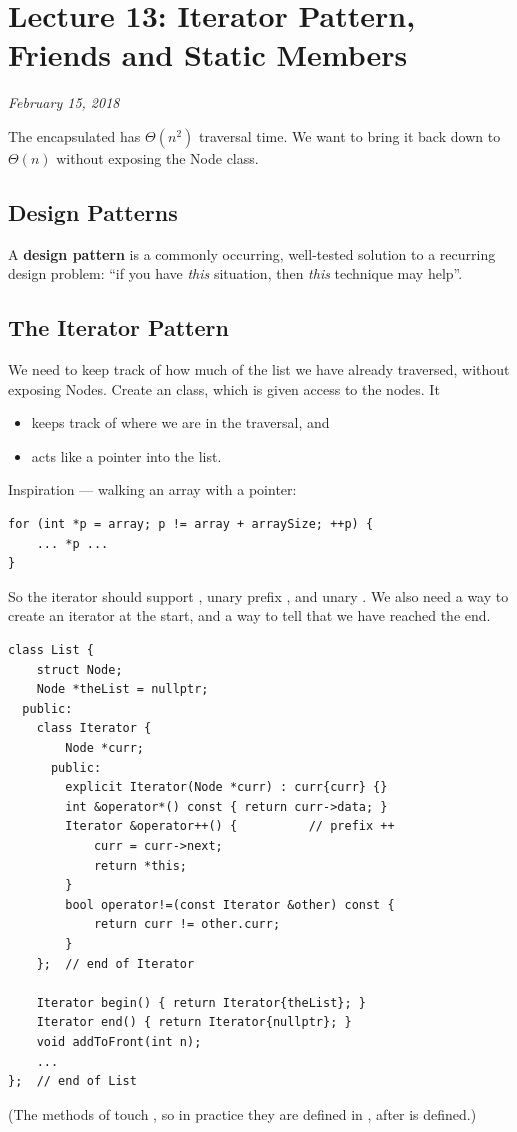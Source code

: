 \chapter{Lecture 13: Iterator Pattern, Friends and Static Members}
\begin{center}
\textit{February 15, 2018}
\end{center}

The encapsulated  has $\Theta(n^2)$ traversal time. We want to bring it
back down to $\Theta(n)$ without exposing the Node class.

\section{Design Patterns}
\begin{definition}
A \textbf{design pattern} is a commonly occurring, well-tested solution to a
recurring design problem: ``if you have \emph{this} situation, then \emph{this}
technique may help''.
\end{definition}

\section{The Iterator Pattern}
We need to keep track of how much of the list we have already traversed,
without exposing Nodes. Create an  class, which is given access
to the nodes. It
\begin{itemize}
  \item keeps track of where we are in the traversal, and
  \item acts like a pointer into the list.
\end{itemize}

Inspiration --- walking an array with a pointer:
\begin{lstlisting}[style=cpp]
for (int *p = array; p != array + arraySize; ++p) {
    ... *p ...
}
\end{lstlisting}
So the iterator should support \code{!=}, unary prefix \code{++}, and unary
\code{*}. We also need a way to create an iterator at the start, and a way to
tell that we have reached the end.

\begin{lstlisting}[style=cpp]
class List {
    struct Node;
    Node *theList = nullptr;
  public:
    class Iterator {
        Node *curr;
      public:
        explicit Iterator(Node *curr) : curr{curr} {}
        int &operator*() const { return curr->data; }
        Iterator &operator++() {          // prefix ++
            curr = curr->next;
            return *this;
        }
        bool operator!=(const Iterator &other) const {
            return curr != other.curr;
        }
    };  // end of Iterator

    Iterator begin() { return Iterator{theList}; }
    Iterator end() { return Iterator{nullptr}; }
    void addToFront(int n);
    ...
};  // end of List
\end{lstlisting}
(The methods of  touch , so in practice they
are defined in , after  is defined.)

